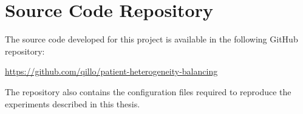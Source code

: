 \chapter{Source Code Repository}
\label{app:source_code}

The source code developed for this project is available in the following GitHub repository:

\begin{center}
    \url{https://github.com/qillo/patient-heterogeneity-balancing}
\end{center}

The repository also contains the configuration files required to reproduce the experiments described in this thesis.